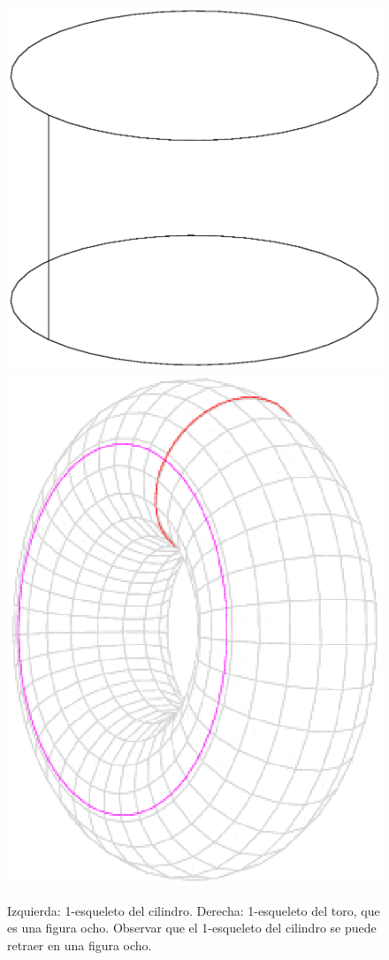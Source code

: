\begin{ejem}
\begin{enumerate}
\begin{figure}[h]
\centering
\includegraphics[scale=0.4]{Figures/1EsqCilindro.eps}
\includegraphics[scale=0.5]{Figures/FiguraOcho.eps}
\caption{Izquierda: 1-esqueleto del cilindro. Derecha: 1-esqueleto del toro, que es una figura ocho. Observar que el 1-esqueleto del cilindro se puede retraer en una figura ocho.}
\end{figure}


\end{enumerate}
\end{ejem}

